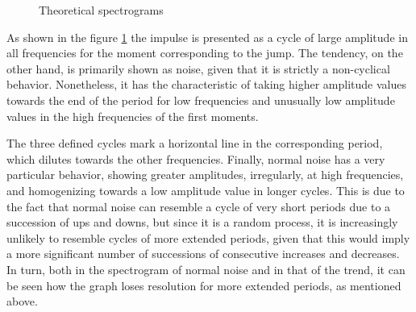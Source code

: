 \documentclass[a4paper,10cpi]{article}
\begin{document}
\begin{figure}[H]
		\vspace{0.00mm}
		\vspace{0.00mm}
		\caption{Theoretical spectrograms} \label{fig:espect_teo}
	\end{figure}
	
	As shown in the figure \ref{fig:espect_teo} the impulse is presented as a cycle of large amplitude in all frequencies for the moment corresponding to the jump. The tendency, on the other hand, is primarily shown as noise, given that it is strictly a non-cyclical behavior. Nonetheless, it has the characteristic of taking higher amplitude values towards the end of the period for low frequencies and unusually low amplitude values in the high frequencies of the first moments.
	
	The three defined cycles mark a horizontal line in the corresponding period, which dilutes towards the other frequencies. Finally, normal noise has a very particular behavior, showing greater amplitudes, irregularly, at high frequencies, and homogenizing towards a low amplitude value in longer cycles. This is due to the fact that normal noise can resemble a cycle of very short periods due to a succession of ups and downs, but since it is a random process, it is increasingly unlikely to resemble cycles of more extended periods, given that this would imply a more significant number of successions of consecutive increases and decreases. In turn, both in the spectrogram of normal noise and in that of the trend, it can be seen how the graph loses resolution for more extended periods, as mentioned above.
	
\end{document}
